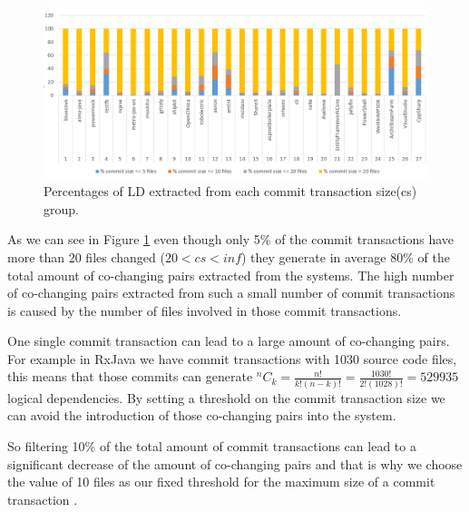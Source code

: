 \documentclass[12pt]{mitthesis}
\newcommand*{\Comb}[2]{{}^{#1}C_{#2}}%
\begin{document}
\begin{figure}[!h]
\centering
\includegraphics[width=\textwidth]{ld_distribution.png}
\caption{Percentages of LD extracted from each commit transaction size(cs) group.}
\label{fig:fig_ld_cs}
\centering
\end{figure}

As we can see in Figure \ref{fig:fig_ld_cs} even though only 5\% of the commit transactions have more than 20 files changed ($20<cs<inf$) they generate in average 80\% of the total amount of co-changing pairs extracted from the systems.
The high number of co-changing pairs extracted from such a small number of commit transactions is caused by the number of files involved in those commit transactions. 

One single commit transaction can lead to a large amount of co-changing pairs. For example in RxJava we have commit transactions with 1030 source code files, this means that those commits can generate 
$\Comb{n}{k}=\frac{n!}{k!(n-k)!} = \frac{1030!}{2!(1028)!} = 529 935$ logical dependencies. By setting a threshold on the commit transaction size we can avoid the introduction of those co-changing pairs into the system.

So filtering 10\% of the total amount of commit transactions can lead to a significant decrease of the amount of co-changing pairs and that is why we choose the value of 10 files as our fixed threshold for the maximum size of a commit transaction \cite{DepSACI}.
\end{document}
